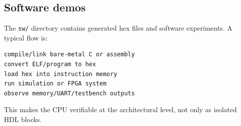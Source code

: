 \subsection{Software demos}

The \texttt{sw/} directory contains generated hex files and software experiments. A typical flow is:

\begin{lstlisting}[language={}]
compile/link bare-metal C or assembly
convert ELF/program to hex
load hex into instruction memory
run simulation or FPGA system
observe memory/UART/testbench outputs
\end{lstlisting}

This makes the CPU verifiable at the architectural level, not only as isolated HDL blocks.

\bigskip
